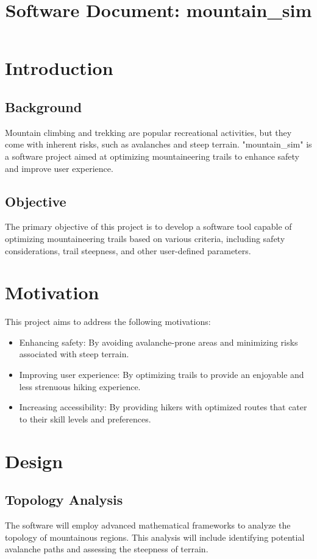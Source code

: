 \documentclass{article}
\title{Software Document: mountain\_sim}
\author{}
\date{}
\begin{document}
\maketitle

\section{Introduction}
\subsection{Background}
Mountain climbing and trekking are popular recreational activities, but they come with inherent risks, such as avalanches and steep terrain. "mountain\_sim" is a software project aimed at optimizing mountaineering trails to enhance safety and improve user experience.

\subsection{Objective}
The primary objective of this project is to develop a software tool capable of optimizing mountaineering trails based on various criteria, including safety considerations, trail steepness, and other user-defined parameters.

\section{Motivation}
This project aims to address the following motivations:
\begin{itemize}[label=-]
    \item Enhancing safety: By avoiding avalanche-prone areas and minimizing risks associated with steep terrain.
    \item Improving user experience: By optimizing trails to provide an enjoyable and less strenuous hiking experience.
    \item Increasing accessibility: By providing hikers with optimized routes that cater to their skill levels and preferences.
\end{itemize}

\section{Design}
\subsection{Topology Analysis}
The software will employ advanced mathematical frameworks to analyze the topology of mountainous regions. This analysis will include identifying potential avalanche paths and assessing the steepness of terrain.
\end{document}
